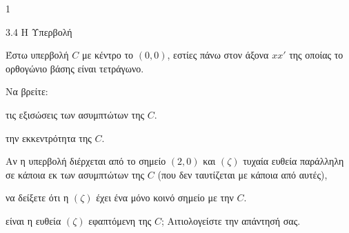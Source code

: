 \begin{ylh}{1}
    \item 3.4 Η Υπερβολή
\end{ylh}
Έστω υπερβολή $C$ με κέντρο το $(0,0)$, εστίες πάνω στον άξονα $xx'$ της οποίας το ορθογώνιο βάσης είναι τετράγωνο.
\begin{alist}
\item Να βρείτε:
    \begin{rlist}
    \item τις εξισώσεις των ασυμπτώτων της $C$. 
    \item την εκκεντρότητα της $C$. 
    \end{rlist}
\item Αν η υπερβολή διέρχεται από το σημείο $(2,0)$ και $(\zeta)$ τυχαία ευθεία παράλληλη σε κάποια εκ των ασυμπτώτων της $C$ (που δεν ταυτίζεται με κάποια από αυτές),
    \begin{rlist}
    \item να δείξετε ότι η $(\zeta)$ έχει ένα μόνο κοινό σημείο με την $C$. 
    \item είναι η ευθεία $(\zeta)$ εφαπτόμενη της $C$; Αιτιολογείστε την απάντησή σας. 
    \end{rlist}
\end{alist}